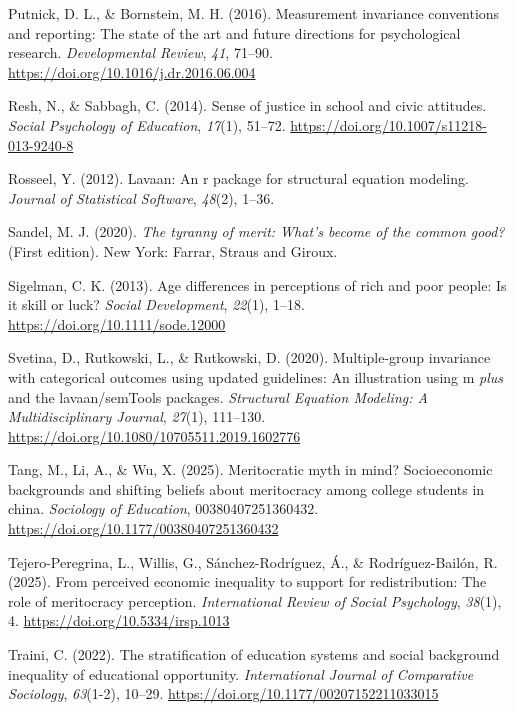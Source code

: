 \documentclass[
  13pt,
]{article}
\newlength{\cslhangindent}
\newenvironment{CSLReferences}[2] %
 {\begin{list}{}{%
  \setlength{\itemindent}{0pt}
  \setlength{\leftmargin}{0pt}
  \setlength{\parsep}{0pt}
  \ifodd #1
   \setlength{\leftmargin}{\cslhangindent}
   \setlength{\itemindent}{-1\cslhangindent}
  \fi
  \setlength{\itemsep}{#2\baselineskip}}}
 {\end{list}}
\begin{document}
\begin{CSLReferences}{1}{0}
Putnick, D. L., \& Bornstein, M. H. (2016). Measurement invariance
conventions and reporting: The state of the art and future directions
for psychological research. \emph{Developmental Review}, \emph{41},
71--90. \url{https://doi.org/10.1016/j.dr.2016.06.004}

Resh, N., \& Sabbagh, C. (2014). Sense of justice in school and civic
attitudes. \emph{Social Psychology of Education}, \emph{17}(1), 51--72.
\url{https://doi.org/10.1007/s11218-013-9240-8}

Rosseel, Y. (2012). Lavaan: An r package for structural equation
modeling. \emph{Journal of Statistical Software}, \emph{48}(2), 1--36.

Sandel, M. J. (2020). \emph{The tyranny of merit: What's become of the
common good?} (First edition). New York: {Farrar, Straus and Giroux}.

Sigelman, C. K. (2013). Age differences in perceptions of rich and poor
people: Is it skill or luck? \emph{Social Development}, \emph{22}(1),
1--18. \url{https://doi.org/10.1111/sode.12000}

Svetina, D., Rutkowski, L., \& Rutkowski, D. (2020). Multiple-group
invariance with categorical outcomes using updated guidelines: An
illustration using m {\emph{plus}} and the lavaan/semTools packages.
\emph{Structural Equation Modeling: A Multidisciplinary Journal},
\emph{27}(1), 111--130.
\url{https://doi.org/10.1080/10705511.2019.1602776}

Tang, M., Li, A., \& Wu, X. (2025). Meritocratic myth in mind?
Socioeconomic backgrounds and shifting beliefs about meritocracy among
college students in china. \emph{Sociology of Education},
00380407251360432. \url{https://doi.org/10.1177/00380407251360432}

Tejero-Peregrina, L., Willis, G., Sánchez-Rodríguez, Á., \&
Rodríguez-Bailón, R. (2025). From perceived economic inequality to
support for redistribution: The role of meritocracy perception.
\emph{International Review of Social Psychology}, \emph{38}(1), 4.
\url{https://doi.org/10.5334/irsp.1013}

Traini, C. (2022). The stratification of education systems and social
background inequality of educational opportunity. \emph{International
Journal of Comparative Sociology}, \emph{63}(1-2), 10--29.
\url{https://doi.org/10.1177/00207152211033015}


\end{CSLReferences}
\end{document}
